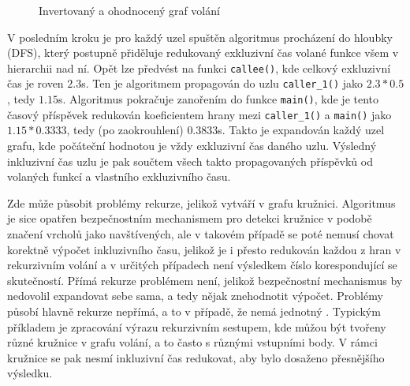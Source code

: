 \documentclass[czech,BP]{thesiskiv}
\begin{document}
\begin{figure}[htp] 
\caption{Invertovaný a ohodnocený graf volání}\label{obr:callgraph_ex_rev}
\end{figure}

V posledním kroku je pro každý uzel spuštěn algoritmus procházení do hloubky (DFS), který postupně přiděluje redukovaný exkluzivní čas volané funkce všem v hierarchii nad ní. Opět lze předvést na funkci \texttt{callee()}, kde celkový exkluzivní čas je roven $2.3$s. Ten je algoritmem propagován do uzlu \texttt{caller\_1()} jako $2.3*0.5$, tedy $1.15$s. Algoritmus pokračuje zanořením do funkce \texttt{main()}, kde je tento časový příspěvek redukován koeficientem hrany mezi \texttt{caller\_1()} a \texttt{main()} jako $1.15*0.3333$, tedy (po zaokrouhlení) $0.3833$s. Takto je expandován každý uzel grafu, kde počáteční hodnotou je vždy exkluzivní čas daného uzlu. Výsledný inkluzivní čas uzlu je pak součtem všech takto propagovaných příspěvků od volaných funkcí a vlastního exkluzivního času.

Zde může působit problémy rekurze, jelikož vytváří v grafu kružnici. Algoritmus je sice opatřen bezpečnostním mechanismem pro detekci kružnice v podobě značení vrcholů jako navštívených, ale v takovém případě se poté nemusí chovat korektně výpočet inkluzivního času, jelikož je i přesto redukován každou z hran v rekurzivním volání a v určitých případech není výsledkem číslo korespondující se skutečností. Přímá rekurze problémem není, jelikož bezpečnostní mechanismus by nedovolil expandovat sebe sama, a tedy nějak znehodnotit výpočet. Problémy působí hlavně rekurze nepřímá, a to v případě, že nemá jednotný . Typickým příkladem je zpracování výrazu rekurzivním sestupem, kde můžou být tvořeny různé kružnice v grafu volání, a to často s různými vstupními body. V rámci kružnice se pak nesmí inkluzivní čas redukovat, aby bylo dosaženo přesnějšího výsledku.
\end{document}

